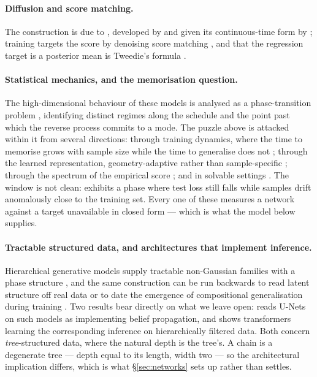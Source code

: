 \documentclass{article}
\begin{document}
\paragraph{Diffusion and score matching.} The construction is due to \citet{sohl2015}, developed
by \citet{ho2020} and given its continuous-time form by \citet{song2021}; training targets the
score by denoising score matching \citep{hyvarinen2005,vincent2011}, and that the regression
target is a posterior mean is Tweedie's formula \citep{robbins1956,miyasawa1961,efron2011}.

\paragraph{Statistical mechanics, and the memorisation question.} The high-dimensional behaviour of
these models is analysed as a phase-transition problem \citep{biroli2023,biroli2024dynamical,
achilli2026speciation}, identifying distinct regimes along the schedule and the point past which
the reverse process commits to a mode. The puzzle above is attacked within it from several
directions: through training dynamics, where the time to memorise grows with sample size while the
time to generalise does not \citep{bonnaire2025memorize,favero2025bigger}; through the learned
representation, geometry-adaptive rather than sample-specific
\citep{kadkhodaie2024generalization}; through the spectrum of the empirical score
\citep{achilli2024losing}; and in solvable settings
\citep{cui2025solvable,raya2023spontaneous,ghio2024sampling}. The window is not clean:
\citet{garnierbrun2026biased} exhibits a phase where test loss still falls while samples drift
anomalously close to the training set. Every one of these measures a network against a target
unavailable in closed form --- which is what the model below supplies.

\paragraph{Tractable structured data, and architectures that implement inference.} Hierarchical
generative models supply tractable non-Gaussian families with a phase structure
\citep{sclocchi2025phase}, and the same construction can be run backwards to read latent structure
off real data \citep{sclocchi2025probing} or to date the emergence of compositional generalisation
during training \citep{favero2025compositional}. Two results bear directly on what we leave open:
\citet{mei2024unet}
reads U-Nets on such models as implementing belief propagation, and
\citet{garnierbrun2024transformers} shows transformers learning the corresponding inference on
hierarchically filtered data. Both concern \emph{tree}-structured data, where the natural depth is
the tree's. A chain is a degenerate tree --- depth equal to its length, width two --- so the
architectural implication differs, which is what \S\ref{sec:networks} sets up rather than settles.
\end{document}

